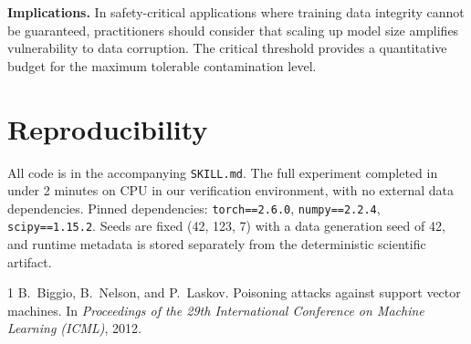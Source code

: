 \documentclass[11pt,a4paper]{article}
\begin{document}
\textbf{Implications.} In safety-critical applications where training data integrity cannot be guaranteed, practitioners should consider that scaling up model size amplifies vulnerability to data corruption. The critical threshold provides a quantitative budget for the maximum tolerable contamination level.

\section{Reproducibility}

All code is in the accompanying \texttt{SKILL.md}. The full experiment completed in under 2 minutes on CPU in our verification environment, with no external data dependencies. Pinned dependencies: \texttt{torch==2.6.0}, \texttt{numpy==2.2.4}, \texttt{scipy==1.15.2}. Seeds are fixed (42, 123, 7) with a data generation seed of 42, and runtime metadata is stored separately from the deterministic scientific artifact.

\begin{thebibliography}{1}
B.~Biggio, B.~Nelson, and P.~Laskov.
\newblock Poisoning attacks against support vector machines.
\newblock In \emph{Proceedings of the 29th International Conference on Machine Learning (ICML)}, 2012.
\end{thebibliography}
\end{document}
